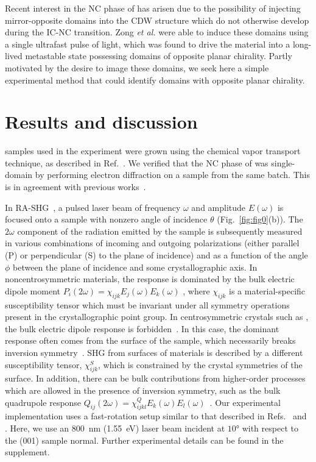 Recent interest in the NC phase of \tastwo has arisen due to the possibility of injecting mirror-opposite domains into the CDW structure \cite{zong_ultrafast_2018} which do not otherwise develop during the IC-NC transition.
Zong \textit{et al.} were able to induce these domains using a single ultrafast pulse of light, which was found to drive the material into a long-lived metastable state possessing domains of opposite planar chirality.
Partly motivated by the desire to image these domains, we seek here a simple experimental method that could identify domains with opposite planar chirality.

\section{Results and discussion}

\tastwo samples used in the experiment were grown using the chemical vapor transport technique, as described in Ref.~\cite{zong_ultrafast_2018}.
We verified that the NC phase of \tastwo was single-domain by performing electron diffraction on a sample from the same batch\cite{supplementary_materials}.
This is in agreement with previous works~\cite{zong_ultrafast_2018, wilson_charge-density_1975, bovet_pseudogapped_2004, shiba_phenomenological_1986}.

In RA-SHG~\cite{harter_high-speed_2015, lu_fast_2018, torchinsky_structural_2015, lu_fourier_2018}, a pulsed laser beam of frequency $\omega$ and amplitude $E(\omega)$ is focused onto a sample with nonzero angle of incidence $\theta$ (Fig.~\ref{fig:fig0}(b)).
The $2\omega$ component of the radiation emitted by the sample is subsequently measured in various combinations of incoming and outgoing polarizations (either parallel (P) or perpendicular (S) to the plane of incidence) and as a function of the angle $\phi$ between the plane of incidence and some crystallographic axis.
In noncentrosymmetric materials, the response is dominated by the bulk electric dipole moment $P_i(2\omega) = \chi_{ijk}E_j(\omega)E_k(\omega)$ \cite{boyd}, where $\chi_{ijk}$ is a material-specific susceptibility tensor which must be invariant under all symmetry operations present in the crystallographic point group.
In centrosymmetric crystals such as \tastwo, the bulk electric dipole response is forbidden~\cite{boyd, powell}.
In this case, the dominant response often comes from the surface of the sample, which necessarily breaks inversion symmetry~\cite{bloembergen_optical_1968}.
SHG from surfaces of materials is described by a different susceptibility tensor, $\chi_{ijk}^S$, which is constrained by the crystal symmetries of the surface.
In addition, there can be bulk contributions from higher-order processes which are allowed in the presence of inversion symmetry, such as the bulk quadrupole response $Q_{ij}(2\omega) = \chi^Q_{ijkl}E_k(\omega)E_l(\omega)$~\cite{kumar_magnetic_2017, shen}.
Our experimental implementation uses a fast-rotation setup similar to that described in Refs.~ and .
Here, we use an \qty{800}{nm} (\qty{1.55}{eV}) laser beam incident at $\ang{10}$ with respect to the (001) sample normal.
Further experimental details can be found in the supplement\cite{supplementary_materials}.

